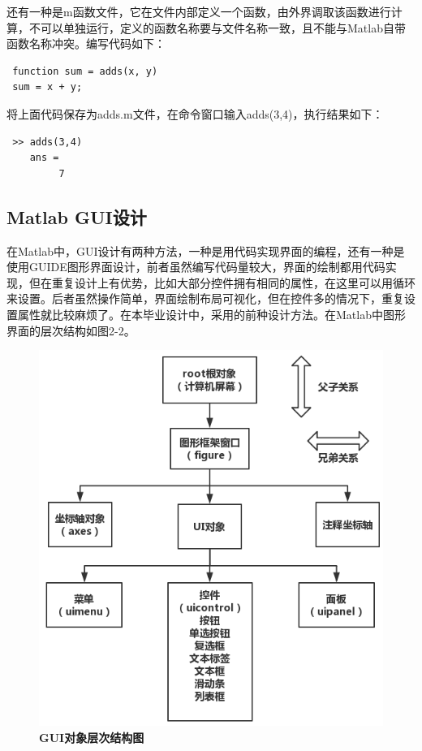 还有一种是m函数文件，它在文件内部定义一个函数，由外界调取该函数进行计算，不可以单独运行，定义的函数名称要与文件名称一致，且不能与Matlab自带函数名称冲突。编写代码如下：
\begin{lstlisting}
 function sum = adds(x, y)
 sum = x + y;\end{lstlisting}
将上面代码保存为adds.m文件，在命令窗口输入adds(3,4)，执行结果如下：
\begin{lstlisting}
 >> adds(3,4)
 	ans =
		 7\end{lstlisting}
\subsection{Matlab GUI设计}
在Matlab中，GUI设计有两种方法，一种是用代码实现界面的编程，还有一种是使用GUIDE图形界面设计，前者虽然编写代码量较大，界面的绘制都用代码实现，但在重复设计上有优势，比如大部分控件拥有相同的属性，在这里可以用循环来设置。后者虽然操作简单，界面绘制布局可视化，但在控件多的情况下，重复设置属性就比较麻烦了。在本毕业设计中，采用的前种设计方法。在Matlab中图形界面的层次结构如图2-2。
\begin{figure}[H]
	\centering
	\includegraphics[scale=0.5]{MatlabGUI}
	\caption{\textbf{GUI对象层次结构图}}
\end{figure}
